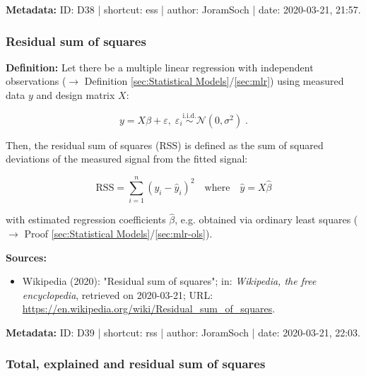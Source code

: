 \documentclass[a4paper,12pt,twoside]{book}
\begin{document}
\vspace{1em}
\textbf{Metadata:} ID: D38 | shortcut: ess | author: JoramSoch | date: 2020-03-21, 21:57.
\vspace{1em}



\subsubsection[\textit{Residual sum of squares}]{Residual sum of squares} \label{sec:rss}
\setcounter{equation}{0}

\textbf{Definition:} Let there be a multiple linear regression with independent observations ($\rightarrow$ Definition \ref{sec:Statistical Models}/\ref{sec:mlr}) using measured data $y$ and design matrix $X$:

\begin{equation} \label{eq:rss-mlr}
y = X\beta + \varepsilon, \; \varepsilon_i \overset{\mathrm{i.i.d.}}{\sim} \mathcal{N}(0, \sigma^2) \; .
\end{equation}

Then, the residual sum of squares (RSS) is defined as the sum of squared deviations of the measured signal from the fitted signal:

\begin{equation} \label{eq:rss-rss}
\mathrm{RSS} = \sum_{i=1}^n (y_i - \hat{y}_i)^2 \quad \text{where} \quad \hat{y} = X \hat{\beta}
\end{equation}

with estimated regression coefficients $\hat{\beta}$, e.g. obtained via ordinary least squares ($\rightarrow$ Proof \ref{sec:Statistical Models}/\ref{sec:mlr-ols}).


\vspace{1em}
\textbf{Sources:}
\begin{itemize}
\item Wikipedia (2020): "Residual sum of squares"; in: \textit{Wikipedia, the free encyclopedia}, retrieved on 2020-03-21; URL: \url{https://en.wikipedia.org/wiki/Residual_sum_of_squares}.
\end{itemize}


\vspace{1em}
\textbf{Metadata:} ID: D39 | shortcut: rss | author: JoramSoch | date: 2020-03-21, 22:03.
\vspace{1em}



\subsubsection[\textbf{Total, explained and residual sum of squares}]{Total, explained and residual sum of squares} \label{sec:mlr-pss}
\setcounter{equation}{0}
\end{document}
